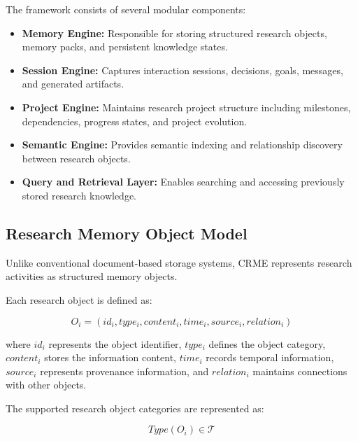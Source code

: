 The framework consists of several modular components:

\begin{itemize}

\item \textbf{Memory Engine:}
Responsible for storing structured research objects, memory packs, and
persistent knowledge states.

\item \textbf{Session Engine:}
Captures interaction sessions, decisions, goals, messages, and generated
artifacts.

\item \textbf{Project Engine:}
Maintains research project structure including milestones,
dependencies, progress states, and project evolution.

\item \textbf{Semantic Engine:}
Provides semantic indexing and relationship discovery between research
objects.

\item \textbf{Query and Retrieval Layer:}
Enables searching and accessing previously stored research knowledge.

\end{itemize}



\subsection{Research Memory Object Model}

Unlike conventional document-based storage systems, CRME represents
research activities as structured memory objects.

Each research object is defined as:

\begin{equation}
O_i=(id_i,type_i,content_i,time_i,source_i,relation_i)
\end{equation}

where $id_i$ represents the object identifier,
$type_i$ defines the object category,
$content_i$ stores the information content,
$time_i$ records temporal information,
$source_i$ represents provenance information,
and $relation_i$ maintains connections with other objects.


The supported research object categories are represented as:

\begin{equation}
Type(O_i)\in\mathcal{T}
\end{equation}


